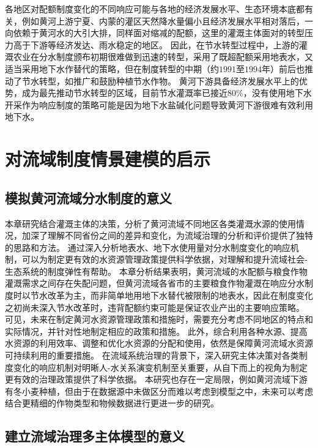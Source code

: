 各地区对配额制度变化的不同响应可能与各地的经济发展水平、生态环境本底都有关，例如黄河上游宁夏、内蒙的灌区天然降水量偏小且经济发展水平相对落后，一向依赖于黄河水的大引大排，同样面对缩减的配额，这里的灌溉主体面对的转型压力高于下游等经济发达、雨水稳定的地区\cite{xiong2021a}。
因此，在节水转型过程中，上游的灌溉农业在分水制度颁布初期很难做到迅速的转型，采用了既超配额采用地表水，又适当采用地下水作替代的策略，但在制度转型的中期（约$1991$至$1994$年）前后也推动了节水转型，如推广和鼓励种植节水作物\cite{yin2021}。
黄河下游具备经济发展水平上的优势，成为最先推动节水转型的区域，目前节水灌溉率已接近$80\%$，没有使用地下水开采作为响应制度的策略可能是因为地下水盐碱化问题导致黄河下游很难有效利用地下水\cite{huangronghan1962, fu2021}。

\section{对流域制度情景建模的启示}

\subsection{模拟黄河流域分水制度的意义}

本章研究结合灌溉主体的决策，分析了黄河流域不同地区各类灌溉水源的使用情况，加深了理解不同省份之间的差异和变化，为流域治理的分析和评价提供了独特的思路和方法。
通过深入分析地表水、地下水使用量对分水制度变化的响应机制，可以为制定更有效的水资源管理政策提供科学依据，对理解和提升流域社会-生态系统的制度弹性有帮助。
本章分析结果表明，黄河流域的水配额与粮食作物灌溉需求之间存在失配问题，但黄河流域各省市的主要粮食作物灌溉在响应分水制度时以节水改革为主，而非简单地用地下水替代被限制的地表水，因此在制度变化之初尚未深入节水改革时，违背配额约束可能是保证农业产出的主要响应策略。
可见，未来在制定黄河水资源管理政策和措施时，需要充分考虑不同地区的特点和实际情况，并针对性地制定相应的政策和措施。
此外，综合利用各种水源、提高水资源的利用效率、调整和优化水资源的分配和使用，依然是保障黄河流域水资源可持续利用的重要措施。
在流域系统治理的背景下，深入研究主体决策对各类制度变化的响应机制对明晰人-水关系演变机制至关重要，从自下而上的视角为制定更有效的治理政策提供了科学依据。
本研究也存在一定局限，例如黄河流域下游有冬小麦种植，但由于在数据源中未做区分而难以考虑到模型之中，未来可以考虑结合更精细的作物类型和物候数据进行更进一步的研究。

\subsection{建立流域治理多主体模型的意义}

